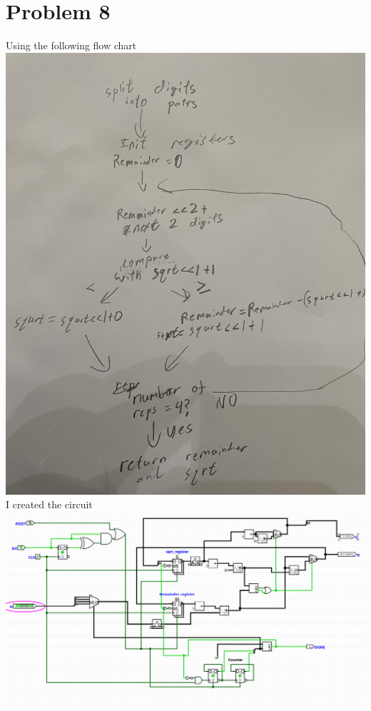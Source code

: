 \documentclass[12pt]{article}
\begin{document}
\section*{Problem 8}
Using the following flow chart\\
\includegraphics[scale=0.25]{fig9.jpg}\\
I created the circuit\\
\includegraphics[scale=0.25]{fig10.png}
\end{document}
